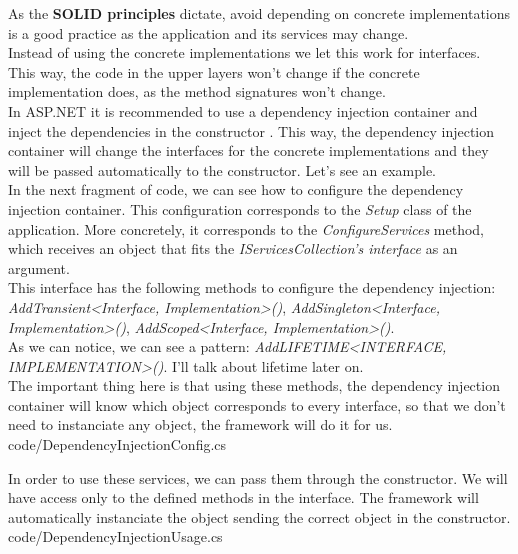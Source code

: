         As the \textbf{SOLID principles} dictate, avoid depending on concrete implementations is a good practice as the application and its services may change. \\
        Instead of using the concrete implementations we let this work for interfaces. This way, the code in the upper layers won't change if the concrete implementation does, as the method signatures won't change. \\

        In ASP.NET it is recommended to use a dependency injection container and inject the dependencies in the constructor \cite{DI}. This way, the dependency injection container will change the interfaces for the concrete implementations and they will be passed automatically to the constructor. Let's see an example. \\

        In the next fragment of code, we can see how to configure the dependency injection container. This configuration corresponds to the \textit{Setup} class of the application. More concretely, it corresponds to the \textit{ConfigureServices} method, which receives an object that fits the \textit{IServicesCollection's interface} as an argument. \\
        This interface has the following methods to configure the dependency injection: \textit{AddTransient<Interface, Implementation>()}, \textit{AddSingleton<Interface, Implementation>()}, \textit{AddScoped<Interface, Implementation>()}. \\
        As we can notice, we can see a pattern: \textit{Add{LIFETIME}<{INTERFACE}, {IMPLEMENTATION}>()}. I'll talk about lifetime later on. \\

        The important thing here is that using these methods, the dependency injection container will know which object corresponds to every interface, so that we don't need to instanciate any object, the framework will do it for us. \\
        
        
        {code/DependencyInjectionConfig.cs}
        

        In order to use these services, we can pass them through the constructor. We will have access only to the defined methods in the interface. The framework will automatically instanciate the object sending the correct object in the constructor. \\
        
        {code/DependencyInjectionUsage.cs}
    

